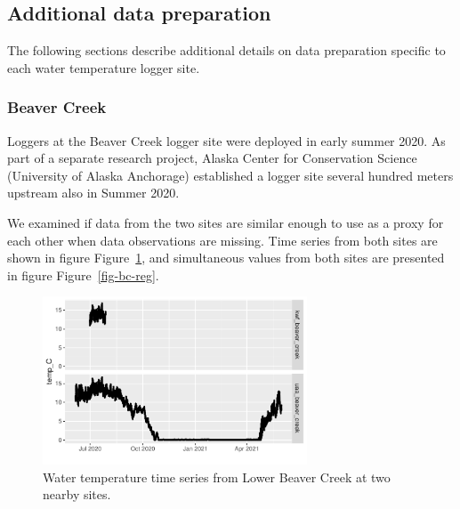 \documentclass[
  letterpaper,
  DIV=11,
  numbers=noendperiod]{scrreprt}
\begin{document}
\hypertarget{additional-data-preparation-1}{%
\subsection{Additional data
preparation}\label{additional-data-preparation-1}}

The following sections describe additional details on data preparation
specific to each water temperature logger site.

\hypertarget{beaver-creek-1}{%
\subsubsection{Beaver Creek}\label{beaver-creek-1}}

Loggers at the Beaver Creek logger site were deployed in early summer
2020. As part of a separate research project, Alaska Center for
Conservation Science (University of Alaska Anchorage) established a
logger site several hundred meters upstream also in Summer 2020.

We examined if data from the two sites are similar enough to use as a
proxy for each other when data observations are missing. Time series
from both sites are shown in figure Figure~\ref{fig-bc-plots}, and
simultaneous values from both sites are presented in figure
Figure~\ref{fig-bc-reg}.

\begin{figure}

{\centering \includegraphics[width=0.7\textwidth,height=0.7\textheight]{./temp_logger_data_prep_files/figure-pdf/fig-bc-plots-1.pdf}

}

\caption{\label{fig-bc-plots}Water temperature time series from Lower
Beaver Creek at two nearby sites.}

\end{figure}
\end{document}
